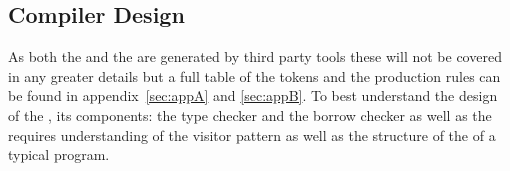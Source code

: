\subsection{Compiler Design}
\label{sec:CompilerDesign}

As both the \lexer{} and the \parser{} are generated by third party tools these will
not be covered in any greater details but a full table of the tokens and the
production rules can be found in appendix~\ref{sec:appA} and \ref{sec:appB}. To best
understand the design of the \static, its components: the type checker and the borrow
checker as well as the \codeGen{} requires understanding of
the visitor pattern as well as the structure of the \ast{} of a typical \lang{}
program.








